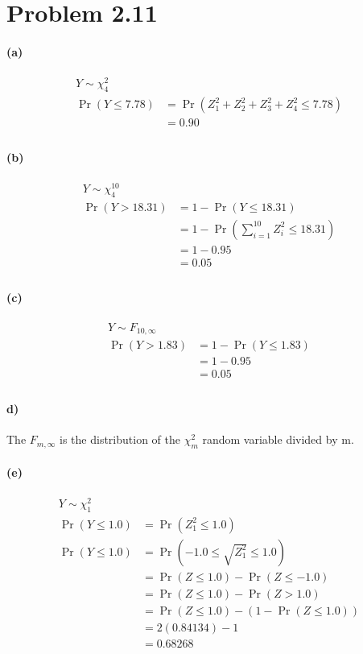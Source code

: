 \documentclass[10pt,letter]{article}
\begin{document}
\section*{Problem 2.11}
\paragraph{(a)}
\begin{align*}
Y \sim \chi_{4}^{2}\\
\Pr(Y\leq 7.78) &= \Pr(Z_{1}^{2}+Z_{2}^{2}+Z_{3}^{2}+Z_{4}^{2}\leq 7.78) \\
&=0.90\\
\end{align*}

\paragraph{(b)}
\begin{align*}
Y \sim \chi_{4}^{10}\\
\Pr(Y> 18.31) &= 1- \Pr(Y \leq 18.31)\\
&=1- \Pr \left(\sum_{i=1}^{10}Z_{i}^{2} \leq 18.31 \right)  \\
&=1-0.95\\
&=0.05\\
\end{align*}

\paragraph{(c)}
\begin{align*}
Y \sim F_{10, \infty}\\
\Pr(Y> 1.83) &= 1- \Pr(Y \leq 1.83)\\
&=1 - 0.95\\
&=0.05\\
\end{align*}

\paragraph{d)}
\begin{center}
The $F_{m,\infty}$ is the distribution of the $\chi_m^2$ random variable divided by m.
\end{center}

\paragraph{(e)}
\begin{align*}
Y \sim \chi_{1}^{2}\\
\Pr(Y\leq 1.0) &= \Pr(Z_{1}^{2}\leq 1.0) \\
\Pr(Y\leq 1.0) &= \Pr\left(-1.0 \leq \sqrt{Z_{1}^{2}}\leq 1.0\right)\\
&=\Pr(Z \leq 1.0) - \Pr(Z \leq -1.0)\\
&=\Pr(Z \leq 1.0) - \Pr(Z > 1.0)\\
&=\Pr(Z \leq 1.0) -\left(1- \Pr(Z \leq 1.0) \right)\\
&=2(0.84134) -1\\
&=0.68268\\
\end{align*}
\end{document}
